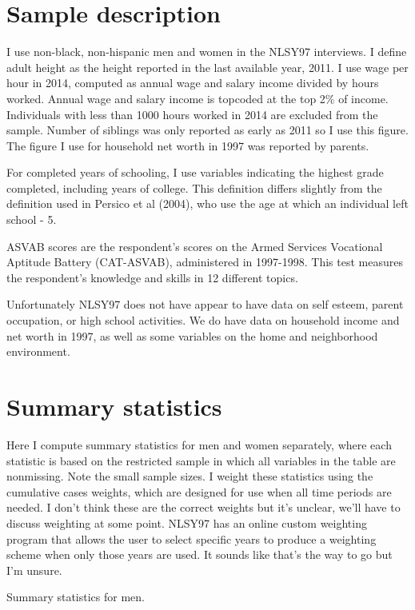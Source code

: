 \documentclass{article}
\begin{document}
\section{Sample description}
I use non-black, non-hispanic men and women in the NLSY97 interviews. I define adult height as the height reported in the last available year, 2011. I use wage per hour in 2014, computed as annual wage and salary income divided by hours worked. Annual wage and salary income is topcoded at the top 2\% of income. Individuals with less than 1000 hours worked in 2014 are excluded from the sample. Number of siblings was only reported as early as 2011 so I use this figure. The figure I use for household net worth in 1997 was reported by parents.

For completed years of schooling, I use variables indicating the highest grade completed, including years of college. This definition differs slightly from the definition used in Persico et al (2004), who use the age at which an individual left school - 5.

ASVAB scores are the respondent's scores on the Armed Services Vocational Aptitude Battery (CAT-ASVAB), administered in 1997-1998. This test measures the respondent's knowledge and skills in 12 different topics.

Unfortunately NLSY97 does not have appear to have data on self esteem, parent occupation, or high school activities. We do have data on household income and net worth in 1997, as well as some variables on the home and neighborhood environment.

\section{Summary statistics}
Here I compute summary statistics for men and women separately, where each statistic is based on the restricted sample in which all variables in the table are nonmissing. Note the small sample sizes. I weight these statistics using the cumulative cases weights, which are designed for use when all time periods are needed. I don't think these are the correct weights but it's unclear, we'll have to discuss weighting at some point. NLSY97 has an online custom weighting program that allows the user to select specific years to produce a weighting scheme when only those years are used. It sounds like that's the way to go but I'm unsure.

\begin{table}[h]
\label{tab:summary_men}
\caption{Summary statistics for men.}

\end{table}
\end{document}
